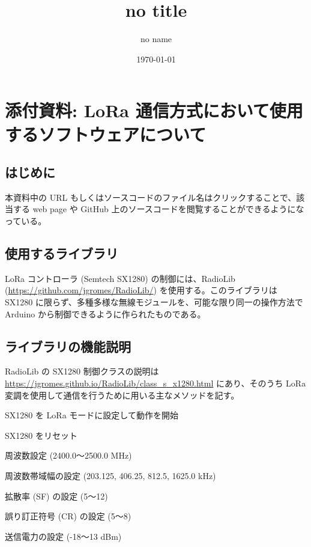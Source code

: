 \documentclass[a4j,oneside]{ujbook}
\begin{document}
\title{no title}
\author{no name}
\date{\today}


\chapter*{添付資料: LoRa 通信方式において使用するソフトウェアについて}

\section*{はじめに}

本資料中の URL もしくはソースコードのファイル名はクリックすることで、該当する web page や GitHub 上のソースコードを閲覧することができるようになっている。

\section*{使用するライブラリ}

LoRa コントローラ (Semtech SX1280) の制御には、RadioLib (\url{https://github.com/jgromes/RadioLib/}) を使用する。このライブラリは SX1280 に限らず、多種多様な無線モジュールを、可能な限り同一の操作方法で Arduino から制御できるように作られたものである。

\section*{ライブラリの機能説明}

RadioLib の SX1280 制御クラスの説明は \url{https://jgromes.github.io/RadioLib/class_s_x1280.html} にあり、そのうち LoRa 変調を使用して通信を行うために用いる主なメソッドを記す。

\begin{description}[style=sameline]
 \item[begin()] SX1280 を LoRa モードに設定して動作を開始
 \item[reset()] SX1280 をリセット
 \item[setFrequency()] 周波数設定 (2400.0〜2500.0 MHz)
 \item[setBandwidth()] 周波数帯域幅の設定 (203.125, 406.25, 812.5, 1625.0 kHz)
 \item[setSpreadingFactor()] 拡散率 (SF) の設定 (5〜12)
 \item[setCodingRate()] 誤り訂正符号 (CR) の設定 (5〜8)
 \item[setOutputPower()] 送信電力の設定 (-18〜13 dBm)
\end{description}
\end{document}
